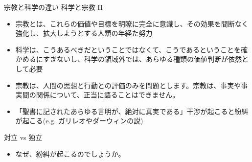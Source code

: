 \documentclass[10pt, dvipdfmx]{beamer}
\begin{document}
\begin{frame}{}


\begin{block}{宗教と科学の違い \hfill 科学と宗教 II}
\begin{itemize}
\item 宗教とは、これらの価値や目標を明瞭に完全に意識し、その効果を間断なく強化し、拡大しようとする人類の年経た努力
\item 科学は、こうあるべきだということではなくて、こうであるということを確かめるにすぎないし、科学の領域外では、あらゆる種類の価値判断が依然として必要
\item 宗教は、人間の思想と行動との評価のみを問題とします。宗教は、事実や事実間の関係について、正当に語ることはできません。
\item 「聖書に記されたあらゆる言明が、絶対に真実である」干渉が起こると紛糾が起こる\hfill (e.g. ガリレオやダーウィンの説)
\end{itemize}
\end{block}

\bigskip
\begin{alertblock}{対立 vs 独立}
\begin{itemize}
\item なぜ、紛糾が起こるのでしょうか。
\end{itemize}
\end{alertblock}

\end{frame}
\end{document}
